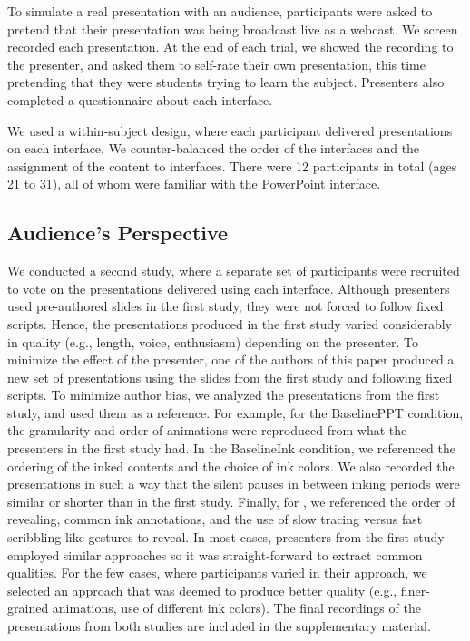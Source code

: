 To simulate a real presentation with an audience, participants were asked to pretend that their presentation was being broadcast live as a webcast. We screen recorded each presentation. At the end of each trial, we showed the recording to the presenter, and asked them to self-rate their own presentation, this time pretending that they were students trying to learn the subject. Presenters also completed a questionnaire about each interface.

We used a within-subject design, where each participant delivered presentations on each interface. We counter-balanced the order of the interfaces and the assignment of the content to interfaces. There were 12 participants in total (ages 21 to 31), all of whom were familiar with the PowerPoint interface. 

\subsection{Audience's Perspective}
We conducted a second study, where a separate set of participants were recruited to vote on the presentations delivered using each interface. Although presenters used pre-authored slides in the first study, they were not forced to follow fixed scripts. Hence, the presentations produced in the first study varied considerably in quality (e.g., length, voice, enthusiasm) depending on the presenter. To minimize the effect of the presenter, one of the authors of this paper produced a new set of presentations using the slides from the first study and following fixed scripts. To minimize author bias, we analyzed the presentations from the first study, and used them as a reference. For example, for the BaselinePPT condition, the granularity and order of animations were reproduced from what the presenters in the first study had. In the BaselineInk condition, we referenced the ordering of the inked contents and the choice of ink colors. We also recorded the presentations in such a way that the silent pauses in between inking periods were similar or shorter than in the first study. Finally, for \interface, we referenced the order of revealing, common ink annotations, and the use of slow tracing versus fast scribbling-like gestures to reveal. In most cases, presenters from the first study employed similar approaches so it was straight-forward to extract common qualities. For the few cases, where participants varied in their approach, we selected an approach that was deemed to produce better quality (e.g., finer-grained animations, use of different ink colors). The final recordings of the presentations from both studies are included in the supplementary material. 

